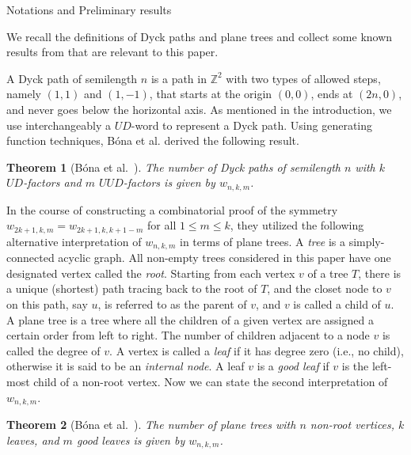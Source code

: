 \documentclass[reqno]{amsart}
\makeatletter
\numberwithin{equation}{section}
\newtheorem{theorem}{Theorem}[section]
\theoremstyle{definition}
\theoremstyle{named}
\def\section{\@startsection{section}{1}
  \z@{.7\linespacing\@plus\linespacing}{.5\linespacing}

  {\normalfont\scshape}}
\newcommand{\bZ}{\mathbb{Z}}
\makeatother
\begin{document}
\section{Notations and Preliminary results}\label{sec:notation}

We recall the definitions of Dyck paths and plane trees and collect some known results from \cite{BDL2022} that are relevant to this paper.

A Dyck path of semilength $n$ is a path in $\bZ^2$ with two types of allowed steps, namely $(1,1)$ and $(1,-1)$, that starts at the origin $(0,0)$, ends at $(2n,0)$, and never goes below the horizontal axis. As mentioned in the introduction, we use interchangeably a $UD$-word to represent a Dyck path. Using generating function techniques, B\'ona et al. derived the following result.
\begin{theorem}[{B\'ona et al.~\cite[Thm.~1.2]{BDL2022}}]\label{thm:path}
The number of Dyck paths of semilength $n$ with $k$ $UD$-factors and $m$ $UUD$-factors is given by $w_{n,k,m}$.
\end{theorem}
In the course of constructing a combinatorial proof of the symmetry $w_{2k+1,k,m}=w_{2k+1,k,k+1-m}$ for all $1\le m\le k$, they utilized the following alternative interpretation of $w_{n,k,m}$ in terms of plane trees. A {\it tree} is a simply-connected acyclic graph. All non-empty trees considered in this paper have one designated vertex called the {\it root}. Starting from each vertex $v$ of a tree $T$, there is a unique (shortest) path tracing back to the root of $T$, and the closet node to $v$ on this path, say $u$, is referred to as the parent of $v$, and $v$ is called a child of $u$. A plane tree is a tree where all the children of a given vertex are assigned a certain order from left to right. The number of children adjacent to a node $v$ is called the degree of $v$. A vertex is called a {\it leaf} if it has degree zero (i.e., no child), otherwise it is said to be an {\it internal node}. A leaf $v$ is a {\it good leaf} if $v$ is the left-most child of a non-root vertex. Now we can state the second interpretation of $w_{n,k,m}$.

\begin{theorem}[{B\'ona et al.~\cite[Prop.~3.1]{BDL2022}}]\label{thm:tree-1}
The number of plane trees with $n$ non-root vertices, $k$ leaves, and $m$ good leaves is given by $w_{n,k,m}$.
\end{theorem}
\end{document}
